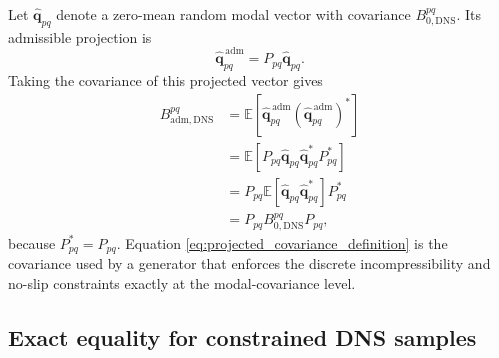 \documentclass[11pt]{article}
\newcommand{\bfq}{\bm{q}}
\newcommand{\Bzero}{B_{0,\mathrm{DNS}}}
\newcommand{\Badm}{B_{\mathrm{adm},\mathrm{DNS}}}
\newcommand{\Pmat}{P}
\begin{document}
Let \(\widehat{\bfq}_{pq}\) denote a zero-mean random modal vector with
covariance \(\Bzero^{pq}\). Its admissible projection is
\[
  \widehat{\bfq}_{pq}^{\,\mathrm{adm}}
  =
  \Pmat_{pq}\widehat{\bfq}_{pq}.
\]
Taking the covariance of this projected vector gives
\begin{align}
  \Badm^{pq}
  &=
  \mathbb{E}\left[
    \widehat{\bfq}_{pq}^{\,\mathrm{adm}}
    \left(\widehat{\bfq}_{pq}^{\,\mathrm{adm}}\right)^*
  \right] \nonumber\\
  &=
  \mathbb{E}\left[
    \Pmat_{pq}\widehat{\bfq}_{pq}
    \widehat{\bfq}_{pq}^*
    \Pmat_{pq}^*
  \right] \nonumber\\
  &=
  \Pmat_{pq}
  \mathbb{E}\left[
    \widehat{\bfq}_{pq}\widehat{\bfq}_{pq}^*
  \right]
  \Pmat_{pq}^* \nonumber\\
  &=
  \Pmat_{pq}\Bzero^{pq}\Pmat_{pq},
  \label{eq:projected_covariance_definition}
\end{align}
because \(\Pmat_{pq}^*=\Pmat_{pq}\). Equation
\eqref{eq:projected_covariance_definition} is the covariance used by a
generator that enforces the discrete incompressibility and no-slip constraints
exactly at the modal-covariance level.

\subsection{Exact equality for constrained DNS samples}
\label{subsec:exact_b0_badm_equality}
\end{document}
